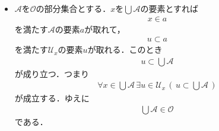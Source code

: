\begin{prf}
\begin{description}
\begin{itemize}
					\item $\mathscr{A}$を$\mathscr{O}$の部分集合とする．$x$を$\bigcup \mathscr{A}$の要素とすれば
						\begin{align}
							x \in a
						\end{align}
						を満たす$\mathscr{A}$の要素$a$が取れて，
						\begin{align}
							u \subset a
						\end{align}
						を満たす$\mathcal{U}_{x}$の要素$u$が取れる．このとき
						\begin{align}
							u \subset \bigcup \mathscr{A}
						\end{align}
						が成り立つ．つまり
						\begin{align}
							\forall x \in \bigcup \mathscr{A}\, \exists u \in \mathcal{U}_{x}\, \left(\, u \subset \bigcup \mathscr{A}\, \right)
						\end{align}
						が成立する．ゆえに
						\begin{align}
							\bigcup \mathscr{A} \in \mathscr{O}
						\end{align}
						である．
				\end{itemize}
				

\end{description}
\end{prf}
